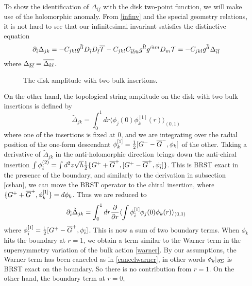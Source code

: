 To show the identification of $\Delta_{ij}$ with the disk two-point 
function, we will make use of the holomorphic anomaly. From 
\eqref{infinv} and the special geometry relations, it is not hard 
to see that our infinitesimal invariant satisfies the distinctive 
equation
\begin{equation}
\eqlabel{diskhan}
\del_\ib \Delta_{jk} =-C_{jkl} g^{\lb l}D_\ib D_\lb\overline{\calt}
+ C_{jkl} C_{\ib\lb\mb} g^{\lb l} g^{\mb m} D_m\calt 
= - C_{jkl} g^{\lb l} \Delta_{\ib\lb}
\end{equation}
where $\Delta_{{\bar k}{\bar l}}=\overline{\Delta_{kl}}$.
%
\begin{figure}[ht]
\begin{center}
\caption{The disk amplitude with two bulk insertions.}
\label{twopoint}
\end{center}
\end{figure}
%
On the other hand, the topological string amplitude on the disk
with two bulk insertions is defined by
\begin{equation}
\tilde \Delta_{jk} = \int_0^1 dr \langle \phi_j(0) \phi_k^{[1]}(r)\rangle_{(0,1)}
\end{equation}
where one of the insertions is fixed at $0$, and we are integrating
over the radial position of the one-form descendant $\phi_k^{[1]}
=\frac 12[G^--{\overline G}^-,\phi_k]$ of the other. Taking a derivative of $\tilde\Delta_{jk}$ 
in the anti-holomorphic direction brings down the anti-chiral insertion
$\int \phi_{\bar i}^{(2)}= \int d^2z\sqrt{h}\frac 12\{G^++{\overline G}^+,[G^+-{\overline G}^+,
\phi_{\bar i}]\}$. This is BRST exact in the presence of the boundary, and 
similarly to the derivation in subsection \ref{cshan}, we can move
the BRST operator to the chiral insertion, where 
$\{G^++{\overline G}^+,\phi_k^{[1]}\}=d\phi_k$. Thus we are reduced to
\begin{equation}
\partial_{\bar i} \tilde\Delta_{jk} = \int_0^1 dr \frac{\partial}{\partial r}\langle\int\phi_{\bar i}^{[1]}
\phi_j(0)\phi_k(r)\rangle_{(0,1)}
\end{equation}
where $\phi_{\bar i}^{[1]}=\frac 12[G^+-{\overline G}^+,\phi_{\bar i}]$. This is now a sum 
of two boundary terms. When $\phi_k$ hits the boundary at $r=1$, we obtain
a term similar to the Warner term in the supersymmetry variation of
the bulk action \eqref{warner}. By our assumptions, the Warner term
has been canceled as in \eqref{cancelwarner}, in other words 
$\phi_k|_{\partial\Sigma}$ is BRST exact on the boundary. So there is no 
contribution from $r=1$. On the other hand, the boundary term at $r=0$, 
